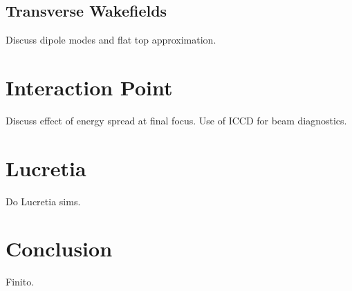 \documentclass[aps,prl,preprint,groupedaddress]{revtex4-1}
\begin{document}
\subsection{Transverse Wakefields}
Discuss dipole modes and flat top approximation.

\section{Interaction Point}
Discuss effect of energy spread at final focus. Use of ICCD for beam diagnostics.

\section{Lucretia}
Do Lucretia sims.

\section{Conclusion}
Finito.


%


\end{document}
